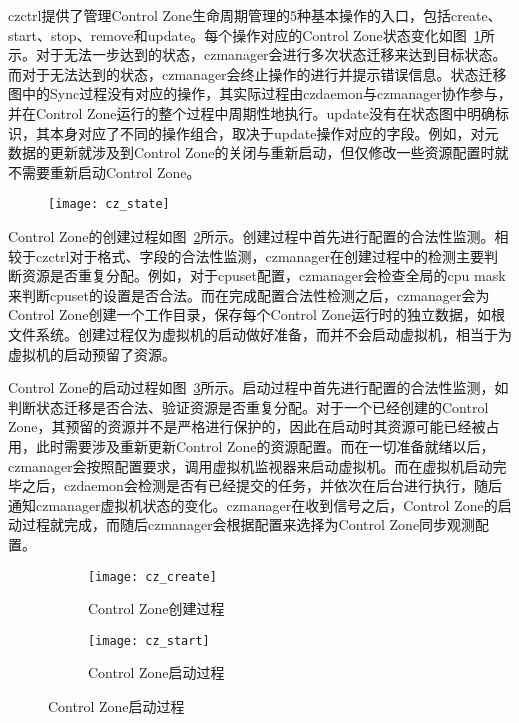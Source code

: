 czctrl提供了管理Control Zone生命周期管理的5种基本操作的入口，包括create、start、stop、remove和update。每个操作对应的Control Zone状态变化如图~\ref{fig:cz_state}所示。对于无法一步达到的状态，czmanager会进行多次状态迁移来达到目标状态。而对于无法达到的状态，czmanager会终止操作的进行并提示错误信息。状态迁移图中的Sync过程没有对应的操作，其实际过程由czdaemon与czmanager协作参与，并在Control Zone运行的整个过程中周期性地执行。update没有在状态图中明确标识，其本身对应了不同的操作组合，取决于update操作对应的字段。例如，对元数据的更新就涉及到Control Zone的关闭与重新启动，但仅修改一些资源配置时就不需要重新启动Control Zone。

\begin{figure}[!htbp]
    \centering
    \texttt{[image: cz\_state]}
    \label{fig:cz_state}
\end{figure}

Control Zone的创建过程如图~\ref{fig:cz_create}所示。创建过程中首先进行配置的合法性监测。相较于czctrl对于格式、字段的合法性监测，czmanager在创建过程中的检测主要判断资源是否重复分配。例如，对于cpuset配置，czmanager会检查全局的cpu mask来判断cpuset的设置是否合法。而在完成配置合法性检测之后，czmanager会为Control Zone创建一个工作目录，保存每个Control Zone运行时的独立数据，如根文件系统。创建过程仅为虚拟机的启动做好准备，而并不会启动虚拟机，相当于为虚拟机的启动预留了资源。

Control Zone的启动过程如图~\ref{fig:cz_start}所示。启动过程中首先进行配置的合法性监测，如判断状态迁移是否合法、验证资源是否重复分配。对于一个已经创建的Control Zone，其预留的资源并不是严格进行保护的，因此在启动时其资源可能已经被占用，此时需要涉及重新更新Control Zone的资源配置。而在一切准备就绪以后，czmanager会按照配置要求，调用虚拟机监视器来启动虚拟机。而在虚拟机启动完毕之后，czdaemon会检测是否有已经提交的任务，并依次在后台进行执行，随后通知czmanager虚拟机状态的变化。czmanager在收到信号之后，Control Zone的启动过程就完成，而随后czmanager会根据配置来选择为Control Zone同步观测配置。

\begin{figure}[H]
    \centering
    \begin{subfigure}[b]{0.42\textwidth}
        \texttt{[image: cz\_create]}
        \caption{\quad Control Zone创建过程}
        \label{fig:cz_create}
    \end{subfigure}
    \hfill
    \begin{subfigure}[b]{0.56\textwidth}
        \texttt{[image: cz\_start]}
        \caption{\quad Control Zone启动过程}
        \label{fig:cz_start}
    \end{subfigure}
\label{fig:cz_create_start}
\end{figure}

